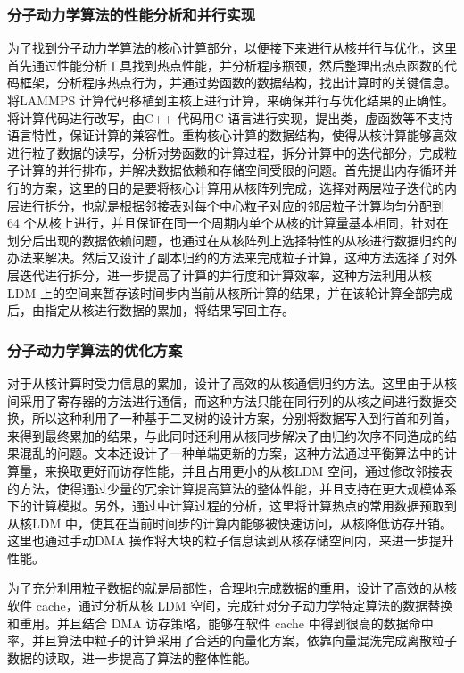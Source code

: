 \subsubsection{分子动力学算法的性能分析和并行实现}
为了找到分子动力学算法的核心计算部分，以便接下来进行从核并行与优化，这里首先通过性能分析工具找到热点性能，并分析程序瓶颈，然后整理出热点函数的代码框架，分析程序热点行为，并通过势函数的数据结构，找出计算时的关键信息。将LAMMPS 计算代码移植到主核上进行计算，来确保并行与优化结果的正确性。将计算代码进行改写，由C++ 代码用C 语言进行实现，提出类，虚函数等不支持语言特性，保证计算的兼容性。重构核心计算的数据结构，使得从核计算能够高效进行粒子数据的读写，分析对势函数的计算过程，拆分计算中的迭代部分，完成粒子计算的并行排布，并解决数据依赖和存储空间受限的问题。首先提出内存循环并行的方案，这里的目的是要将核心计算用从核阵列完成，选择对两层粒子迭代的内层进行拆分，也就是根据邻接表对每个中心粒子对应的邻居粒子计算均匀分配到 64 个从核上进行，并且保证在同一个周期内单个从核的计算量基本相同，针对在划分后出现的数据依赖问题，也通过在从核阵列上选择特性的从核进行数据归约的办法来解决。然后又设计了副本归约的方法来完成粒子计算，这种方法选择了对外层迭代进行拆分，进一步提高了计算的并行度和计算效率，这种方法利用从核LDM 上的空间来暂存该时间步内当前从核所计算的结果，并在该轮计算全部完成后，由指定从核进行数据的累加，将结果写回主存。

\subsubsection{分子动力学算法的优化方案}
对于从核计算时受力信息的累加，设计了高效的从核通信归约方法。这里由于从核间采用了寄存器的方法进行通信，而这种方法只能在同行列的从核之间进行数据交换，所以这种利用了一种基于二叉树的设计方案，分别将数据写入到行首和列首，来得到最终累加的结果，与此同时还利用从核同步解决了由归约次序不同造成的结果混乱的问题。文本还设计了一种单端更新的方案，这种方法通过平衡算法中的计算量，来换取更好而访存性能，并且占用更小的从核LDM 空间，通过修改邻接表的方法，使得通过少量的冗余计算提高算法的整体性能，并且支持在更大规模体系下的计算模拟。另外，通过中计算过程的分析，这里将计算热点的常用数据预取到从核LDM 中，使其在当前时间步的计算内能够被快速访问，从核降低访存开销。这里也通过手动DMA 操作将大块的粒子信息读到从核存储空间内，来进一步提升性能。

为了充分利用粒子数据的就是局部性，合理地完成数据的重用，设计了高效的从核软件 cache，通过分析从核 LDM 空间，完成针对分子动力学特定算法的数据替换和重用。并且结合 DMA 访存策略，能够在软件 cache 中得到很高的数据命中率，并且算法中粒子的计算采用了合适的向量化方案，依靠向量混洗完成离散粒子数据的读取，进一步提高了算法的整体性能。

